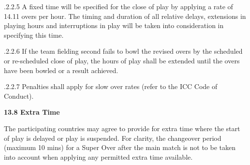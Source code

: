 \documentclass[12pt]{article}
\begin{document}
\vspace{\baselineskip}
\begin{adjustwidth}{1.97in}{0.0in}
{\fontsize{9pt}{10.8pt}.2.2.5 \tabto{1.96in} A fixed time will be specified for the close of play by applying a rate of 14.11 overs per hour. The timing and duration of all relative delays, extensions in playing hours and interruptions in play will be taken into consideration in specifying this time.\par}\par

\end{adjustwidth}


\vspace{\baselineskip}
\begin{adjustwidth}{1.97in}{0.08in}
\begin{justify}
{\fontsize{9pt}{10.8pt}.2.2.6 \tabto{1.96in} If the team fielding second fails to bowl the revised overs by the scheduled or re-scheduled close of play, the hours of play shall be extended until the overs have been bowled or a result achieved.\par}
\end{justify}\par

\end{adjustwidth}


\vspace{\baselineskip}
\begin{adjustwidth}{1.18in}{0.0in}
{\fontsize{9pt}{10.8pt}.2.2.7 \tabto{1.96in} Penalties shall apply for slow over rates (refer to the ICC Code of Conduct).\par}\par

\end{adjustwidth}


\vspace{\baselineskip}
{\fontsize{11pt}{13.2pt}\selectfont \textbf{13.8 \tabto{0.47in} Extra Time}\par}\par


\vspace{\baselineskip}
\begin{adjustwidth}{0.0in}{0.04in}
{\fontsize{9pt}{10.8pt}\selectfont The participating countries may agree to provide for extra time where the start of play is delayed or play is suspended. For clarity, the changeover period (maximum 10 mins) for a Super Over after the main match is not to be taken into account when applying any permitted extra time available.\par}\par

\end{adjustwidth}
\end{document}
